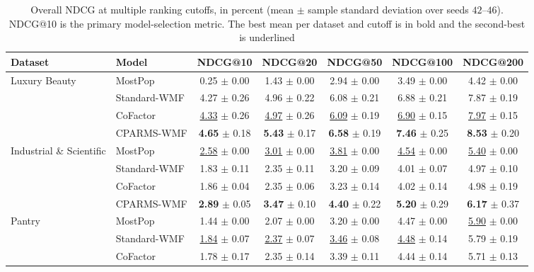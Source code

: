\documentclass[pdflatex,sn-vancouver-num]{sn-jnl}%
\theoremstyle{thmstyleone}%
\theoremstyle{thmstyletwo}%
\theoremstyle{thmstylethree}%
\begin{document}
\begin{table}
\centering
\caption{Overall NDCG at multiple ranking cutoffs, in percent (mean $\pm$ sample standard
deviation over seeds $42$--$46$). NDCG@10 is the primary model-selection metric. The best
mean per dataset and cutoff is in bold and the second-best is underlined}
\label{tab:ndcg_cutoffs}
\small
\renewcommand{\arraystretch}{1.15}
\begin{tabular*}{\textheight}{@{\extracolsep{\fill}}llccccc@{}}
\toprule
Dataset & Model & NDCG@10 & NDCG@20 & NDCG@50 & NDCG@100 & NDCG@200 \\
\midrule
Luxury Beauty & MostPop & 0.25 $\pm$ 0.00 & 1.43 $\pm$ 0.00 & 2.94 $\pm$ 0.00 & 3.49 $\pm$ 0.00 & 4.42 $\pm$ 0.00 \\
              & Standard-WMF & 4.27 $\pm$ 0.26 & 4.96 $\pm$ 0.22 & 6.08 $\pm$ 0.21 & 6.88 $\pm$ 0.21 & 7.87 $\pm$ 0.19 \\
              & CoFactor & \underline{4.33} $\pm$ 0.26 & \underline{4.97} $\pm$ 0.26 & \underline{6.09} $\pm$ 0.19 & \underline{6.90} $\pm$ 0.15 & \underline{7.97} $\pm$ 0.15 \\
              & CPARMS-WMF & \textbf{4.65} $\pm$ 0.18 & \textbf{5.43} $\pm$ 0.17 & \textbf{6.58} $\pm$ 0.19 & \textbf{7.46} $\pm$ 0.25 & \textbf{8.53} $\pm$ 0.20 \\
\midrule
Industrial \& Scientific & MostPop & \underline{2.58} $\pm$ 0.00 & \underline{3.01} $\pm$ 0.00 & \underline{3.81} $\pm$ 0.00 & \underline{4.54} $\pm$ 0.00 & \underline{5.40} $\pm$ 0.00 \\
              & Standard-WMF & 1.83 $\pm$ 0.11 & 2.35 $\pm$ 0.11 & 3.20 $\pm$ 0.09 & 4.01 $\pm$ 0.07 & 4.97 $\pm$ 0.10 \\
              & CoFactor & 1.86 $\pm$ 0.04 & 2.35 $\pm$ 0.06 & 3.23 $\pm$ 0.14 & 4.02 $\pm$ 0.14 & 4.98 $\pm$ 0.19 \\
              & CPARMS-WMF & \textbf{2.89} $\pm$ 0.05 & \textbf{3.47} $\pm$ 0.10 & \textbf{4.40} $\pm$ 0.22 & \textbf{5.20} $\pm$ 0.29 & \textbf{6.17} $\pm$ 0.37 \\
\midrule
Pantry        & MostPop & 1.44 $\pm$ 0.00 & 2.07 $\pm$ 0.00 & 3.20 $\pm$ 0.00 & 4.47 $\pm$ 0.00 & \underline{5.90} $\pm$ 0.00 \\
              & Standard-WMF & \underline{1.84} $\pm$ 0.07 & \underline{2.37} $\pm$ 0.07 & \underline{3.46} $\pm$ 0.08 & \underline{4.48} $\pm$ 0.14 & 5.79 $\pm$ 0.19 \\
              & CoFactor & 1.78 $\pm$ 0.17 & 2.35 $\pm$ 0.14 & 3.39 $\pm$ 0.11 & 4.44 $\pm$ 0.14 & 5.71 $\pm$ 0.13 \\

\end{tabular*}
\end{table}
\end{document}
